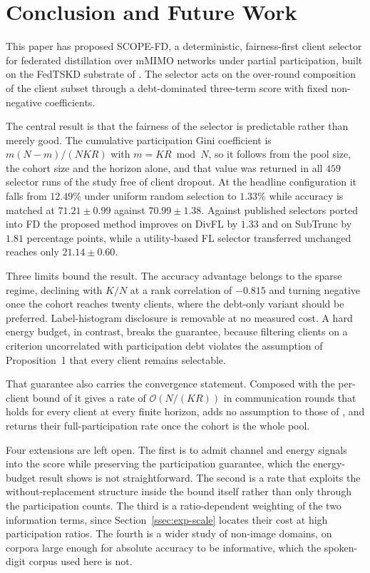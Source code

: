 \documentclass[journal]{IEEEtran}
\newcommand{\new}[1]{#1}
\newcommand{\rev}[1]{#1}
\begin{document}
\section{Conclusion and Future Work}
\label{sec:conclusion}
This paper has proposed SCOPE-FD, a deterministic, fairness-first client selector for federated distillation over mMIMO networks under partial participation, built on the FedTSKD substrate of \cite{mu2024fedtskd}. The selector acts on the over-round composition of the client subset through a debt-dominated three-term score with fixed non-negative coefficients.

\rev{The central result is that the fairness of the selector is predictable rather than merely good. The cumulative participation Gini coefficient is $m(N-m)/(NKR)$ with $m = KR \bmod N$, so it follows from the pool size, the cohort size and the horizon alone, and that value was returned in all $459$ selector runs of the study free of client dropout. At the headline configuration it falls from $12.49\%$ under uniform random selection to $1.33\%$ while accuracy is matched at $71.21 \pm 0.99$ against $70.99 \pm 1.38$. Against published selectors ported into FD the proposed method improves on DivFL by $1.33$ and on SubTrunc by $1.81$ percentage points, while a utility-based FL selector transferred unchanged reaches only $21.14 \pm 0.60$.}

\rev{Three limits bound the result. The accuracy advantage belongs to the sparse regime, declining with $K/N$ at a rank correlation of $-0.815$ and turning negative once the cohort reaches twenty clients, where the debt-only variant should be preferred. Label-histogram disclosure is removable at no measured cost. A hard energy budget, in contrast, breaks the guarantee, because filtering clients on a criterion uncorrelated with participation debt violates the assumption of Proposition~1 that every client remains selectable.}

\rev{That guarantee also carries the convergence statement. Composed with the per-client bound of \cite{mu2024fedtskd} it gives a rate of $\mathcal{O}(N/(KR))$ in communication rounds that holds for every client at every finite horizon, adds no assumption to those of \cite{mu2024fedtskd}, and returns their full-participation rate once the cohort is the whole pool.}

\new{Four extensions are left open. The first is to admit channel and energy signals into the score while preserving the participation guarantee, which the energy-budget result shows is not straightforward. \rev{The second is a rate that exploits the without-replacement structure inside the bound itself rather than only through the participation counts.} The third is a ratio-dependent weighting of the two information terms, since Section~\ref{ssec:exp-scale} locates their cost at high participation ratios. \rev{The fourth is a wider study of non-image domains, on corpora large enough for absolute accuracy to be informative, which the spoken-digit corpus used here is not.}}
\end{document}
